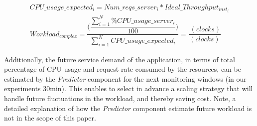 
{\scriptsize
\begin{equation}\label{workload_complexity}
\begin{split}
CPU\_usage\_expected_{i} =  Num\_reqs\_server_{i}  * Ideal\_Throughput_{inst_{i}} \\
Workload_{complex}  = \dfrac{ \bigg(  \dfrac{ \sum_{i=1}^N \%CPU\_usage\_server_{i} } {100} \bigg) }  {  \sum_{i=1}^N  CPU\_usage\_expected_{i}     } = \dfrac{ \ (clocks) }  {  (clocks) }
\end{split}
\end{equation}
}

Additionally, the future service demand of the application, in terms of total percentage of CPU usage and request rate consumed by the resources, can be estimated by the \emph{Predictor} component for the next monitoring windows (in our experiments 30min). This enables to select in advance a scaling strategy that will handle future fluctuations in the workload, and thereby saving cost. Note, a detailed explanation of how the \emph{Predictor} component estimate future workload is not in the scope of this paper.




